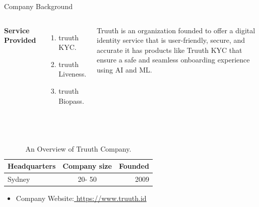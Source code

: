\documentclass[aspectratio=169,xcolor=dvipsnames]{beamer}
\begin{document}
\begin{frame}{Company Background}
    \tableofcontents

    \begin{columns}[c] %

        \textbf{Service Provided}
        \begin{enumerate}
            \item truuth KYC.
            \item truuth Liveness.
            \item truuth Biopass.
        \end{enumerate}

         Truuth is an organization founded to offer a digital identity service that is user-friendly, secure, and accurate it has products like Truuth KYC that ensure a safe and seamless onboarding experience using AI and ML.

    \end{columns}   \\
    
\begin{table}[h!]
  \begin{center}
    \caption{An Overview of Truuth Company.}
    \label{tab:table1}
    \begin{tabular}{|l|c|r|} %
      \hline
      \textbf{Headquarters } & \textbf{Company size} & \textbf{Founded}\\
      
      \hline
      Sydney & 20- 50  & 2009 \\
      \hline
     
    \end{tabular}
  \end{center}
\end{table}   \newline
\begin{itemize}
      
    \item \alert{Company Website:}\href{ https://www.truuth.id/}{ https://www.truuth.id}
 
    \end{itemize}
\end{frame}
\end{document}

